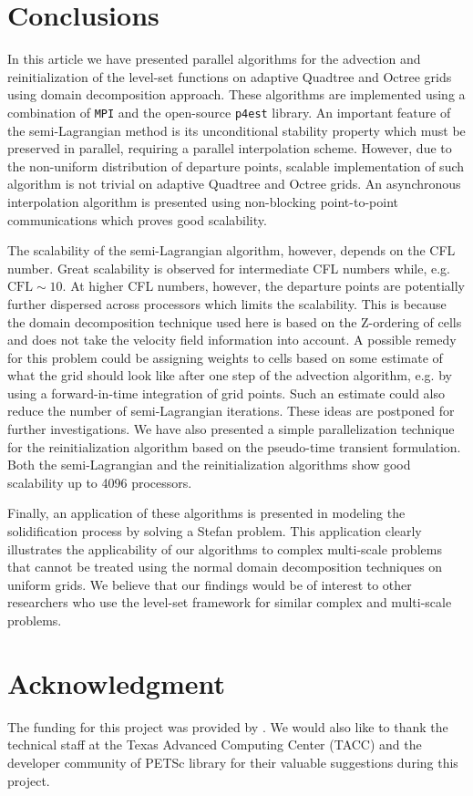 \section{Conclusions}
In this article we have presented parallel algorithms for the advection and reinitialization of the level-set functions on adaptive Quadtree and Octree grids using domain decomposition approach. These algorithms are implemented using a combination of \texttt{MPI} and the open-source \texttt{p4est} library. An important feature of the semi-Lagrangian method is its unconditional stability property which must be preserved in parallel, requiring a parallel interpolation scheme. However, due to the non-uniform distribution of departure points, scalable implementation of such algorithm is not trivial on adaptive Quadtree and Octree grids. An asynchronous interpolation algorithm is presented using non-blocking point-to-point communications which proves good scalability. 

The scalability of the semi-Lagrangian algorithm, however, depends on the CFL number. Great scalability is observed for intermediate CFL numbers while, e.g. $\text{CFL}\sim10$. At higher CFL numbers, however, the departure points are potentially further dispersed across processors which limits the scalability. This is because the domain decomposition technique used here is based on the Z-ordering of cells and does not take the velocity field information into account. A possible remedy for this problem could be assigning weights to cells based on some estimate of what the grid should look like after one step of the advection algorithm, e.g. by using a forward-in-time integration of grid points. Such an estimate could also reduce the number of semi-Lagrangian iterations. These ideas are postponed for further investigations. We have also presented a simple parallelization technique for the reinitialization algorithm based on the pseudo-time transient formulation. Both the semi-Lagrangian and the reinitialization algorithms show good scalability up to 4096 processors. 

Finally, an application of these algorithms is presented in modeling the solidification process by solving a Stefan problem. This application clearly illustrates the applicability of our algorithms to complex multi-scale problems that cannot be treated using the normal domain decomposition techniques on uniform grids. We believe that our findings would be of interest to other researchers who use the level-set framework for similar complex and multi-scale problems.

\section*{Acknowledgment} 
The funding for this project was provided by . We would also like to thank the technical staff at the Texas Advanced Computing Center (TACC) and the developer community of PETSc library for their valuable suggestions during this project.